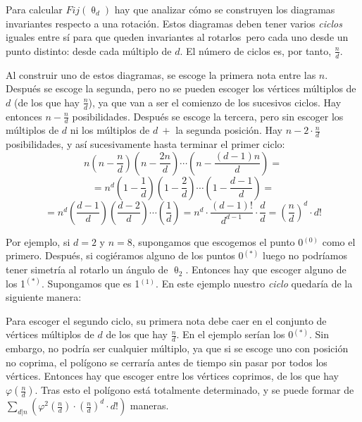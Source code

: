 		Para calcular ${Fij}(\uptheta_d)$ hay que analizar c\'omo se construyen los diagramas invariantes respecto a una rotaci\'on. Estos diagramas deben tener varios \textit{ciclos} iguales entre s\'i \textemdash para que queden invariantes al rotarlos\textemdash~pero cada uno desde un punto distinto: desde cada m\'ultiplo de $d$. El n\'umero de ciclos es, por tanto, $\frac{n}{d}$.
		
		Al construir uno de estos diagramas, se escoge la primera nota entre las $n$. Despu\'es se escoge la segunda, pero no se pueden escoger los v\'ertices m\'ultiplos de $d$ (de los que hay $\frac{n}{d}$), ya que van a ser el comienzo de los sucesivos ciclos. Hay entonces $n-\frac{n}{d}$ posibilidades. Despu\'es se escoge la tercera, pero sin escoger los m\'ultiplos de $d$ ni los m\'ultiplos de $d\ +$ la segunda posici\'on. Hay $n - 2\cdot\frac{n}{d}$ posibilidades, y as\'i sucesivamente hasta terminar el primer ciclo:
		\[n\left(n-\frac{n}{d}\right)\left(n-\frac{2n}{d}\right)\cdots\left(n-\frac{(d-1)n}{d}\right)=\] 
		\[=n^d\left(1-\frac{1}{d}\right)\left(1-\frac{2}{d}\right)\cdots\left(1-\frac{d-1}{d}\right)=\]
		\[=n^d\left(\frac{d-1}{d}\right)\left(\frac{d-2}{d}\right)\cdots\left(\frac{1}{d}\right)=n^d\cdot\frac{(d-1)!}{d^{d-1}}\cdot\frac{d}{d}=\left(\frac{n}{d}\right)^d\cdot d!\]
		
		Por ejemplo, si $d=2$ y $n=8$, supongamos que escogemos el punto 0$^{(0)}$ como el primero. Despu\'es, si cogi\'eramos alguno de los puntos 0$^{(*)}$ luego no podr\'iamos tener simetr\'ia al rotarlo un \'angulo de $\uptheta_2$. Entonces hay que escoger alguno de los 1$^{(*)}$. Supongamos que es 1$^{(1)}$. En este ejemplo nuestro \textit{ciclo} quedar\'ia de la siguiente manera:
		
		
		Para escoger el segundo ciclo, su primera nota debe caer en el conjunto de v\'ertices m\'ultiplos de $d$ \textemdash de los que hay $\frac{n}{d}$. En el ejemplo ser\'ian los 0$^{(*)}$. Sin embargo, no podr\'ia ser cualquier m\'ultiplo, ya que si se escoge uno con posici\'on no coprima, el pol\'igono se cerrar\'ia antes de tiempo sin pasar por todos los v\'ertices. Entonces hay que escoger entre los v\'ertices coprimos, de los que hay $\varphi\left(\frac{n}{d}\right)$. Tras esto el pol\'igono est\'a totalmente determinado, y se puede formar de $\sum\limits_{d|n}\left(\varphi^2(\frac{n}{d})\cdot\left(\frac{n}{d}\right)^d\cdot d!\right)$ maneras.
		
